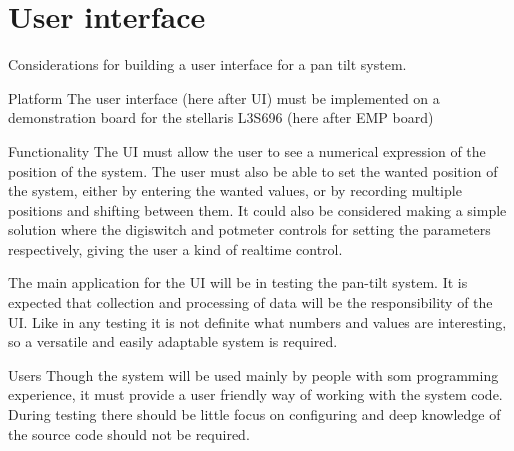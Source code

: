 \chapter{User interface}\label{chap:ui}
Considerations for building a user interface for a pan tilt system.

Platform The user interface (here after UI) must be implemented on a
demonstration board for the stellaris L3S696 (here after EMP board)

Functionality The UI must allow the user to see a numerical expression of the
position of the system. The user must also be able to set the wanted position of
the system, either by entering the wanted values, or by recording multiple
positions and shifting between them. It could also be considered making a simple
solution where the digiswitch and potmeter controls for setting the parameters
respectively, giving the user a kind of realtime control.

The main application for the UI will be in testing the pan-tilt system. It is
expected that collection and processing of data will be the responsibility of
the UI. Like in any testing it is not definite what numbers and values are
interesting, so a versatile and easily adaptable system is required.

Users Though the system will be used mainly by people with som programming
experience, it must provide a user friendly way of working with the system code.
During testing there should be little focus on configuring and deep knowledge of
the source code should not be required.

